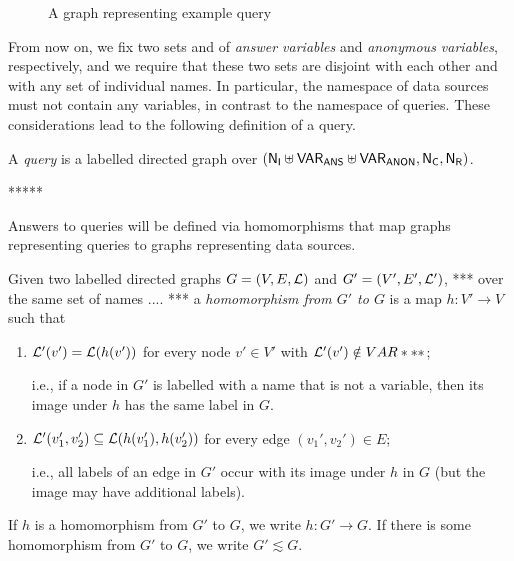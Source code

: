 \begin{figure}
  \caption{A graph representing example query }
  \label{fig:graph_for_exa_query2'}
\end{figure}

From now on, we fix two sets \VARANS and \VARANON
of \emph{answer variables} and \emph{anonymous variables}, respectively,
and we require that these two sets are disjoint with each other
and with any set \NI of individual names.
In particular, the namespace of data sources must not contain any variables,
in contrast to the namespace of queries.
These considerations lead to the following definition of a query.

\begin{definition}
  A \emph{query} is a labelled directed graph
  over $(\mathsf{N}_\mathsf{I} \uplus \mathsf{VAR}_\mathsf{ANS} \uplus \mathsf{VAR}_\mathsf{ANON}, \mathsf{N}_\mathsf{C}, \mathsf{N}_\mathsf{R})$.
\end{definition}



*****


Answers to queries will be defined via homomorphisms that map graphs representing queries
to graphs representing data sources.
%
\begin{definition}
  Given two labelled directed graphs $G = (V,E,\mathcal{L})$ and $G' = (V',E',\mathcal{L}')$,
  *** over the same set of names .... ***
  a \emph{homomorphism from $G'$ to $G$} is a map $h : V' \to V$ such that
  \begin{enumerate}
    \item
      $\mathcal{L}'(v') = \mathcal{L}(h(v'))$ for every node $v' \in V'$ with $\mathcal{L}'(v') \notin VAR***$;
      
      i.e., if a node in $G'$ is labelled with a name that is not a variable,
      then its image under $h$ has the same label in $G$.
    \item
      $\mathcal{L}'(v_1', v_2') \subseteq \mathcal{L}(h(v_1'), h(v_2'))$
      for every edge $(v_1',v_2') \in E$;
      
      i.e., all labels of an edge in $G'$ occur with its image under $h$ in $G$
      (but the image may have additional labels).
  \end{enumerate}
  If $h$ is a homomorphism from $G'$ to $G$, we write $h : G' \to G$.
  If there is some homomorphism from $G'$ to $G$, we write $G' \lesssim G$.
\end{definition}

